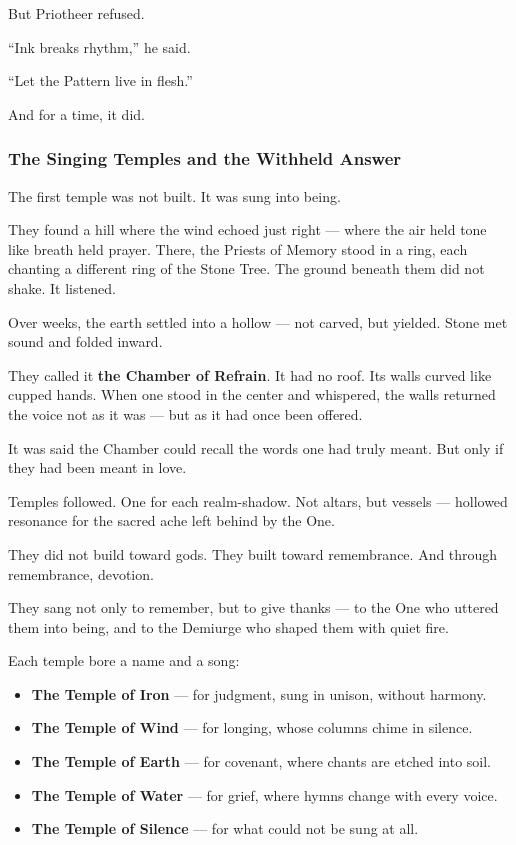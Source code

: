 \documentclass[12pt]{article}
\begin{document}
But Priotheer refused.

“Ink breaks rhythm,” he said.

“Let the Pattern live in flesh.”

And for a time, it did.

\dotfill

\subsubsection{The Singing Temples and the Withheld Answer}

The first temple was not built.  
It was sung into being.

They found a hill where the wind echoed just right —  
where the air held tone like breath held prayer.  
There, the Priests of Memory stood in a ring, each chanting a different ring of the Stone Tree.  
The ground beneath them did not shake.  
It listened.

Over weeks, the earth settled into a hollow — not carved, but yielded.  
Stone met sound and folded inward.

They called it \textbf{the Chamber of Refrain}.  
It had no roof.  
Its walls curved like cupped hands.  
When one stood in the center and whispered,  
the walls returned the voice not as it was —  
but as it had once been offered.

It was said the Chamber could recall the words one had truly meant.  
But only if they had been meant in love.

Temples followed.  
One for each realm-shadow.  
Not altars, but vessels —  
hollowed resonance for the sacred ache left behind by the One.

They did not build toward gods.  
They built toward remembrance.  
And through remembrance, devotion.

They sang not only to remember,  
but to give thanks —  
to the One who uttered them into being,  
and to the Demiurge who shaped them with quiet fire.

Each temple bore a name and a song:

\begin{itemize}
\item \textbf{The Temple of Iron} — for judgment, sung in unison, without harmony.
\item \textbf{The Temple of Wind} — for longing, whose columns chime in silence.
\item \textbf{The Temple of Earth} — for covenant, where chants are etched into soil.
\item \textbf{The Temple of Water} — for grief, where hymns change with every voice.
\item \textbf{The Temple of Silence} — for what could not be sung at all.
\end{itemize}
\end{document}

